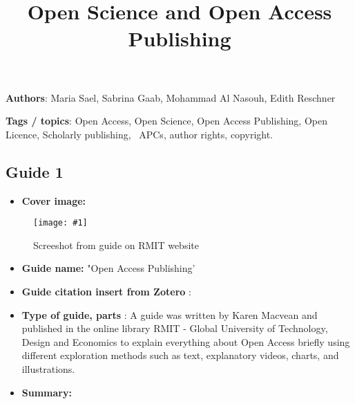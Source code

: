 \documentclass{article}
\newlength{\imgwidth}
\newcommand\scaledgraphics[2]{%
                
\settowidth{\imgwidth}{\texttt{[image: \#1]}}%
                
\setlength{\imgwidth}{\minof{\imgwidth}{#2\textwidth}}%
                
\texttt{[image: \#1]}%
                
}
\begin{document}
\title{Open Science and Open Access Publishing }

\maketitle





\textbf{Authors}:  Maria Sael, Sabrina Gaab, Mohammad Al Nasouh, Edith Reschner


\textbf{Tags / topics}: Open Access, Open Science, Open Access Publishing, Open Licence, Scholarly publishing,  APCs, author rights, copyright.


\subsection{Guide 1}\label{H7151279}


\begin{itemize}
\item \textbf{Cover image:} 


\end{itemize}
\begin{figure}
\scaledgraphics{add6dfd7-ef0a-49dc-b0a6-7ae1e4e54339.png}{1}
\caption*{Screeshot from guide on RMIT website}\label{F87257141}
\end{figure}




\begin{itemize}
\item \textbf{Guide name:} "Open Access Publishing'


\item \textbf{Guide citation insert from Zotero} :  \autocite{macvean_all_2021} 


\item \textbf{Type of guide, parts} : A guide was written by Karen Macvean and published in the online library RMIT - Global University of Technology, Design and Economics to explain everything about Open Access briefly using different exploration methods such as text, explanatory videos, charts, and illustrations.


\item \textbf{Summary:} 


\end{itemize}
\end{document}
